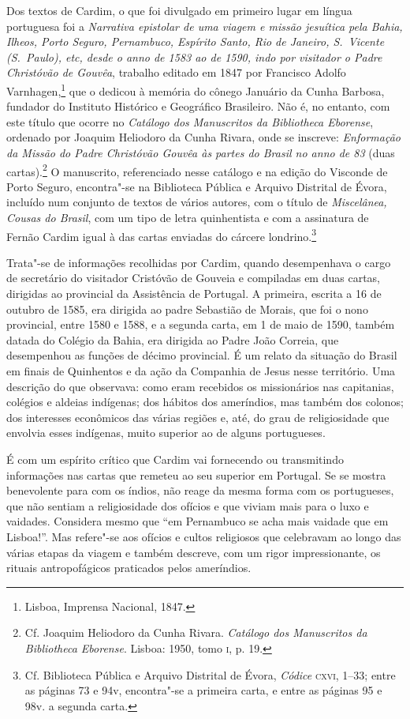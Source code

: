 Dos textos de Cardim, o que foi divulgado em primeiro lugar em língua
portuguesa foi a \textit{Narrativa epistolar de uma viagem e missão
jesuítica pela Bahia, Ilheos, Porto Seguro, Pernambuco, Espírito Santo,
Rio de Janeiro, S.~Vicente (S.~Paulo), etc, desde o anno de 1583 ao de
1590, indo por visitador o Padre Christóvão de Gouvêa}, trabalho
editado em 1847 por Francisco Adolfo Varnhagen,\footnote{ Lisboa,
Imprensa Nacional, 1847.} que o dedicou à memória do cônego Januário da
Cunha Barbosa, fundador do Instituto Histórico e Geográfico Brasileiro.
Não é, no entanto, com este título que ocorre no \textit{Catálogo dos
Manuscritos da Bibliotheca Eborense}, ordenado por Joaquim Heliodoro da
Cunha Rivara, onde se inscreve: \textit{Enformação da Missão do Padre
Christóvão Gouvêa às partes do Brasil no anno de 83} (duas
cartas).\footnote{ Cf. Joaquim Heliodoro da Cunha Rivara.\label{cunharivara}
\textit{Catálogo dos Manuscritos da Bibliotheca Eborense}. Lisboa:
1950, tomo \textsc{i}, p. 19.} O manuscrito, referenciado nesse catálogo e na
edição do Visconde de Porto Seguro, encontra"-se na Biblioteca Pública e
Arquivo Distrital de Évora, incluído num conjunto de textos de vários
autores, com o título de \textit{Miscelânea, Cousas do Brasil}, com um
tipo de letra quinhentista e com a assinatura de Fernão Cardim igual à
das cartas enviadas do cárcere londrino.\footnote{ Cf. Biblioteca
Pública e Arquivo Distrital de Évora, \textit{Códice} \textsc{cxvi}, 1--33; 
entre as páginas 73 e 94v, encontra"-se a primeira carta, e entre
as páginas 95 e 98v. a segunda carta.}

Trata"-se de informações recolhidas por Cardim, quando desempenhava o
cargo de secretário do visitador Cristóvão de Gouveia e compiladas em
duas cartas, dirigidas ao provincial da Assistência de Portugal. A
primeira, escrita a 16 de outubro de 1585, era dirigida ao padre
Sebastião de Morais, que foi o nono provincial, entre 1580 e 1588, e a
segunda carta, em 1 de maio de 1590, também datada do Colégio da Bahia,
era dirigida ao Padre João Correia, que desempenhou as funções de
décimo provincial. É um relato da situação do Brasil em finais de
Quinhentos e da ação da Companhia de Jesus nesse território. Uma
descrição do que observava: como eram recebidos os missionários nas
capitanias, colégios e aldeias indígenas; dos hábitos dos ameríndios,
mas também dos colonos; dos interesses econômicos das várias regiões e,
até, do grau de religiosidade que envolvia esses indígenas, muito
superior ao de alguns portugueses. 

É com um espírito crítico que Cardim vai fornecendo ou transmitindo
informações nas cartas que remeteu ao seu superior em Portugal. Se se
mostra benevolente para com os índios, não reage da mesma forma com os
portugueses, que não sentiam a religiosidade dos ofícios e que viviam
mais para o luxo e vaidades. Considera mesmo que ``em
Pernambuco se acha mais vaidade que em Lisboa!''. Mas refere"-se aos
ofícios e cultos religiosos que celebravam ao longo das várias etapas
da viagem e também descreve, com um rigor impressionante, os rituais
antropofágicos praticados pelos ameríndios.

